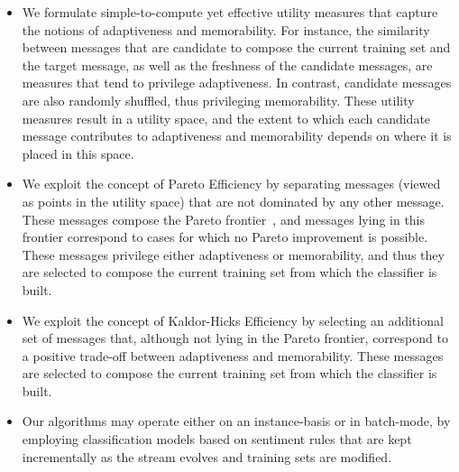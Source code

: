 \begin{itemize}
\item We formulate simple-to-compute yet effective utility measures that capture the notions of adaptiveness and memorability. For instance, the similarity between messages that are candidate to compose the current training set and the target message, as well as the freshness of the candidate messages, are measures that tend to privilege adaptiveness. In contrast, candidate messages are also randomly shuffled, thus privileging memorability. These utility measures result in a utility space, and the extent to which each candidate message contributes to adaptiveness and memorability depends on where it is placed in this space.
\item We exploit the concept of Pareto Efficiency by separating messages (viewed as points in the utility space) that are not dominated by any other message. These messages compose the Pareto frontier~\cite{palda@book}, and messages lying in this frontier correspond to cases for which no Pareto improvement is possible. These messages privilege either adaptiveness or memorability, and thus they are selected to compose the current training set from which the classifier is built.
\item We exploit the concept of Kaldor-Hicks Efficiency by selecting an additional set of messages that, although not lying in the Pareto frontier, correspond to a positive trade-off between adaptiveness and memorability. These messages are selected to compose the current training set from which the classifier is built.
\item Our algorithms may operate either on an instance-basis or in batch-mode, by employing classification models based on sentiment rules that are kept incrementally as the stream evolves and training sets are modified.
\end{itemize}


